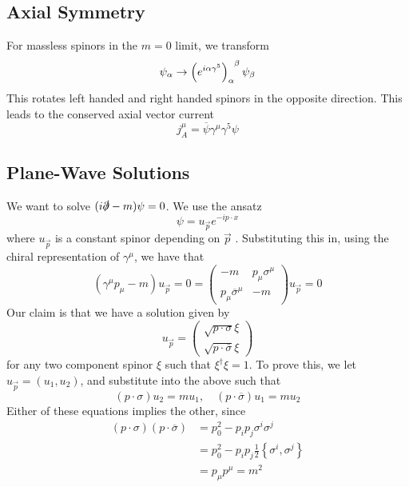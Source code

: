 \subsection{Axial Symmetry} 
For massless spinors in the $ m = 0 $ limit, 
we transform 
\[
	\psi _{ \alpha } \to \left(  e ^{ i \alpha \gamma ^ 5 }  \right) \indices{ _ \alpha ^ \beta }
	\psi _ \beta 
\] This rotates left handed and right handed spinors in the 
opposite direction. This leads to 
the conserved axial vector current 
\[
 j _ A ^ \mu  = \overline{ \psi  } \gamma ^ \mu \gamma ^ 5 \psi 
\] 

\subsection{Plane-Wave Solutions} 
We want to solve $ ( i \slashed{\partial}  -m ) \psi = 0 $. 
We use the ansatz 
\[
 \psi = u_{ \vec{p} } e ^{ - i p \cdot  x }
\] where $ u _{ \vec{p} }  $ is a constant spinor 
depending on $ \vec{p} $ . 
Substituting this in, using the chiral representation
of $ \gamma ^ \mu $, we have that 
\[
 ( \gamma ^ \mu p _ \mu - m ) u _{ \vec{p} }  = 0  = 
 \begin{pmatrix}  - m & p _ \mu \sigma ^ \mu \\ p _ \mu \overline{ \sigma } ^ \mu 
 & - m  \end{pmatrix} u _{ \vec{p} }  =0 
\] Our claim is that we have a solution 
given by 
\[
 u _{ \vec{p} }  = \begin{pmatrix}  \sqrt{ p \cdot  \sigma }  \xi \\
 \sqrt{ p \cdot  \overline{ \sigma } }  \xi \end{pmatrix} 
\] for any two component spinor $ \xi $ such that $ \xi ^ \dagger \xi = 1 $. 
To prove this, we let  $ u _ { \vec{p} } = ( u _ 1, u _ 2 ) $, and 
substitute into the above such that 
\[
	( p \cdot  \sigma ) u _ 2 = m u _1 , \quad ( p \cdot  \overline{ \sigma } ) u _ 1 
	 = m u _ 2 
\] Either of these equations implies the other, since 
\begin{align*}
	( p \cdot  \sigma ) ( p \cdot  \overline{ \sigma } ) &=  
	p_0^ 2 - p _ i p _ j \sigma ^ i \sigma ^ j \\
	&=   p_0 ^ 2  - p _ i p_ j \frac{1}{2 } \left\{  \sigma ^ i , \sigma ^ j  \right\}  \\
	&=  p _\mu p ^ \mu   = m ^ 2  
\end{align*}

